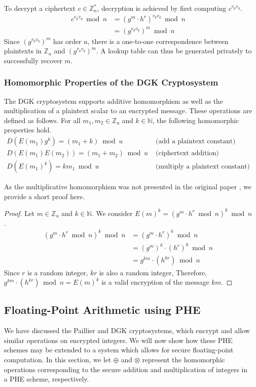 To decrypt a ciphertext $c \in \mathbb{Z}_n^\ast$, decryption is achieved by first computing $c^{v_pv_q}$.
\begin{align*}
	c^{v_pv_q} \bmod n
	&= (g^m \cdot h^r)^{v_pv_q} \bmod n\\
	&= (g^{v_pv_q})^m \bmod n
\end{align*}
Since $(g^{v_pv_q})^m$ has order $u$, there is a one-to-one correspondence between plaintexts in $\mathbb{Z}_u$ and  $(g^{v_pv_q})^m$. A lookup table can thus be generated privately to successfully recover $m$.

\subsubsection{Homomorphic Properties of the DGK Cryptosystem}
The DGK cryptosystem supports additive homomorphism as well as the multiplication of a plaintext scalar to an encrypted message. These operations are defined as follows.
For all $m_1,m_2 \in \mathbb{Z}_u$ and $k\in \mathbb{N}$, the following homomorphic properties hold.
\begin{align*}
    D(E(m_1)g^k)=(m_1+k)\bmod u & \text{ (add a plaintext constant)}\\
    D(E(m_1)E(m_2))=(m_1+m_2)\bmod u & \text{ (ciphertext addition)}\\
    D(E(m_1)^k)= km_1\bmod u & \text{ (multiply a plaintext constant)}
\end{align*}

As the multiplicative homomorphism was not presented in the original paper \cite{pieprzyk_efficient_2007, cryptoeprint:2008:321}, we provide a short proof here.
\begin{proof}
  Let $m \in \mathbb{Z}_u$ and $k\in \mathbb{N}$.
  We consider $E(m)^k = (g^m \cdot h^r \bmod{n})^k\bmod n$.
  \begin{align*}
    (g^m \cdot h^r \bmod{n})^k \bmod n
    &= (g^m \cdot h^r)^k \bmod{n}\\
    &= (g^m)^k \cdot (h^r)^k \bmod{n}\\
    &= g^{km} \cdot (h^{kr}) \bmod{n}
  \end{align*}
  Since $r$ is a random integer, $kr$ is also a random integer, Therefore, $g^{km} \cdot (h^{kr}) \bmod{n} = E(m)^k$ is a valid encryption of the message $km$.
\end{proof}

\subsection{Floating-Point Arithmetic using PHE}
\label{sec:fp_arithmetic}
We have discussed the Paillier and DGK cryptosystems, which encrypt and allow similar operations on encrypted integers. We will now show how these PHE schemes may be extended to a system which allows for secure floating-point computation. In this section, we let $\oplus$ and $\otimes$ represent the homomorphic operations corresponding to the secure addition and multiplication of integers in a PHE scheme, respectively. 

